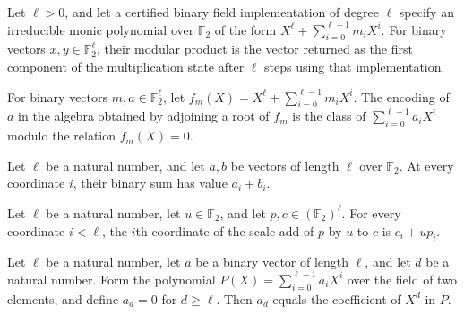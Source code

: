 \begin{definition}
\label{FABL.binaryMulMod}
\leanok
{}
Let $\ell>0$, and let a certified binary field implementation of degree $\ell$ specify
an irreducible monic polynomial over $\mathbb{F}_2$ of the form
$X^\ell+\sum_{i=0}^{\ell-1}m_iX^i$. For binary vectors $x,y\in\mathbb{F}_2^\ell$, their
modular product is the vector returned as the first component of the multiplication
state after $\ell$ steps using that implementation.
\end{definition}

\begin{definition}
\label{FABL.binaryAdjoinRootEncode}
\leanok
{}
For binary vectors $m,a\in\mathbb{F}_2^\ell$, let
$f_m(X)=X^\ell+\sum_{i=0}^{\ell-1}m_iX^i$. The encoding of $a$ in the algebra obtained
by adjoining a root of $f_m$ is the class of $\sum_{i=0}^{\ell-1}a_iX^i$ modulo the
relation $f_m(X)=0$.
\end{definition}

\begin{theorem}
\label{FABL.binaryAdd_apply}
\leanok
{}
Let $\ell$ be a natural number, and let $a,b$ be vectors of length $\ell$ over
$\mathbb{F}_2$. At every coordinate $i$, their binary sum has value $a_i+b_i$.
\end{theorem}

\begin{theorem}
\label{FABL.binaryScaleAdd_apply}
\leanok
{}
Let $\ell$ be a natural number, let $u\in\mathbb{F}_2$, and let
$p,c\in(\mathbb{F}_2)^\ell$. For every coordinate $i<\ell$, the $i$th coordinate of the
scale-add of $p$ by $u$ to $c$ is $c_i+u p_i$.
\end{theorem}

\begin{theorem}
\label{FABL.binaryCoefficientAt_eq_coeff_binaryLowPolynomial}
\leanok
{}
Let $\ell$ be a natural number, let $a$ be a binary vector of length $\ell$, and let $d$ be a
natural number. Form the polynomial $P(X)=\sum_{i=0}^{\ell-1}a_iX^i$ over the field of two
elements, and define $a_d=0$ for $d\ge\ell$. Then $a_d$ equals the coefficient of $X^d$ in
$P$.
\end{theorem}

